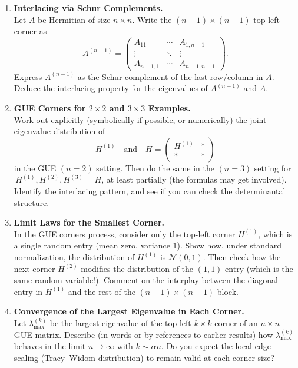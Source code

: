 \documentclass[letterpaper,11pt,oneside,reqno]{article}
\numberwithin{equation}{section}
\theoremstyle{definition}
\begin{document}
\begin{enumerate}[1.]

\item \textbf{Interlacing via Schur Complements.} \\
Let \(A\) be Hermitian of size \(n\times n\). Write the \((n-1)\times (n-1)\) top-left corner as
\[
A^{(n-1)} = \begin{pmatrix}
A_{11} & \cdots & A_{1,n-1}\\
\vdots & \ddots & \vdots\\
A_{n-1,1} & \cdots & A_{n-1,n-1}
\end{pmatrix}.
\]
Express \(A^{(n-1)}\) as the Schur complement of the last row/column in \(A\). Deduce the interlacing property for the eigenvalues of \(A^{(n-1)}\) and \(A\).

\item \textbf{GUE Corners for \(2\times 2\) and \(3\times 3\) Examples.} \\
Work out explicitly (symbolically if possible, or numerically) the joint eigenvalue distribution of
\[
H^{(1)} \quad\text{and}\quad H=\begin{pmatrix}
H^{(1)} & *\\
* & *
\end{pmatrix}
\]
in the GUE \((n=2)\) setting. Then do the same in the \((n=3)\) setting for
\(\,H^{(1)},H^{(2)},H^{(3)}=H\), at least partially (the formulas may get involved). Identify the interlacing pattern, and see if you can check the determinantal structure.

\item \textbf{Limit Laws for the Smallest Corner.} \\
In the GUE corners process, consider only the top-left corner \(H^{(1)}\), which is a single random entry (mean zero, variance \(1\)). Show how, under standard normalization, the distribution of \(H^{(1)}\) is \(\mathcal{N}(0,1)\). Then check how the next corner \(H^{(2)}\) modifies the distribution of the \((1,1)\) entry (which is the same random variable!). Comment on the interplay between the diagonal entry in \(H^{(1)}\) and the rest of the \((n-1)\times(n-1)\) block.

\item \textbf{Convergence of the Largest Eigenvalue in Each Corner.} \\
Let \(\lambda_{\max}^{(k)}\) be the largest eigenvalue of the top-left \(k\times k\) corner of an \(n\times n\) GUE matrix. Describe (in words or by references to earlier results) how \(\lambda_{\max}^{(k)}\) behaves in the limit \(n\to\infty\) with \(k\sim \alpha n\). Do you expect the local edge scaling (Tracy--Widom distribution) to remain valid at each corner size?


\end{enumerate}
\end{document}

